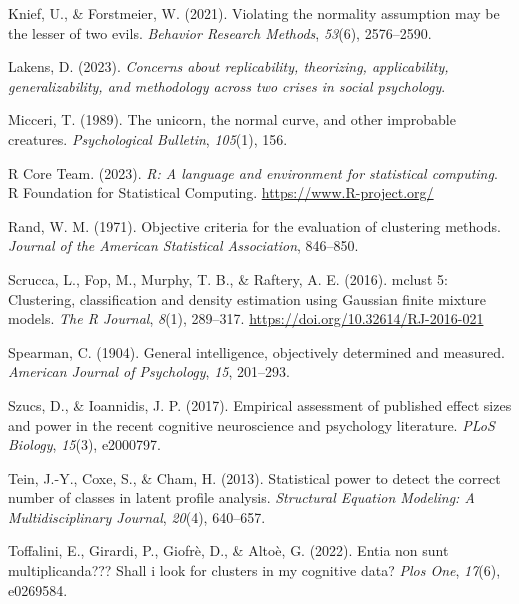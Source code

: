 \documentclass[
  man,floatsintext]{apa7}
\newlength{\cslhangindent}
\newlength{\cslentryspacingunit} %
\newenvironment{CSLReferences}[2] %
 {%
  \setlength{\parindent}{0pt}
  \ifodd #1
  \let\oldpar\par
  \def\par{\hangindent=\cslhangindent\oldpar}
  \fi
  \setlength{\parskip}{#2\cslentryspacingunit}
 }%
 {}
\begin{document}
\begin{CSLReferences}{1}{0}
\leavevmode{}%
Knief, U., \& Forstmeier, W. (2021). Violating the normality assumption may be the lesser of two evils. \emph{Behavior Research Methods}, \emph{53}(6), 2576--2590.

\leavevmode{}%
Lakens, D. (2023). \emph{Concerns about replicability, theorizing, applicability, generalizability, and methodology across two crises in social psychology}.

\leavevmode{}%
Micceri, T. (1989). The unicorn, the normal curve, and other improbable creatures. \emph{Psychological Bulletin}, \emph{105}(1), 156.

\leavevmode{}%
R Core Team. (2023). \emph{R: A language and environment for statistical computing}. R Foundation for Statistical Computing. \url{https://www.R-project.org/}

\leavevmode{}%
Rand, W. M. (1971). Objective criteria for the evaluation of clustering methods. \emph{Journal of the American Statistical Association}, 846--850.

\leavevmode{}%
Scrucca, L., Fop, M., Murphy, T. B., \& Raftery, A. E. (2016). {mclust} 5: Clustering, classification and density estimation using {G}aussian finite mixture models. \emph{The {R} Journal}, \emph{8}(1), 289--317. \url{https://doi.org/10.32614/RJ-2016-021}

\leavevmode{}%
Spearman, C. (1904). General intelligence, objectively determined and measured. \emph{American Journal of Psychology}, \emph{15}, 201--293.

\leavevmode{}%
Szucs, D., \& Ioannidis, J. P. (2017). Empirical assessment of published effect sizes and power in the recent cognitive neuroscience and psychology literature. \emph{PLoS Biology}, \emph{15}(3), e2000797.

\leavevmode{}%
Tein, J.-Y., Coxe, S., \& Cham, H. (2013). Statistical power to detect the correct number of classes in latent profile analysis. \emph{Structural Equation Modeling: A Multidisciplinary Journal}, \emph{20}(4), 640--657.

\leavevmode{}%
Toffalini, E., Girardi, P., Giofrè, D., \& Altoè, G. (2022). Entia non sunt multiplicanda??? Shall i look for clusters in my cognitive data? \emph{Plos One}, \emph{17}(6), e0269584.


\end{CSLReferences}
\end{document}
